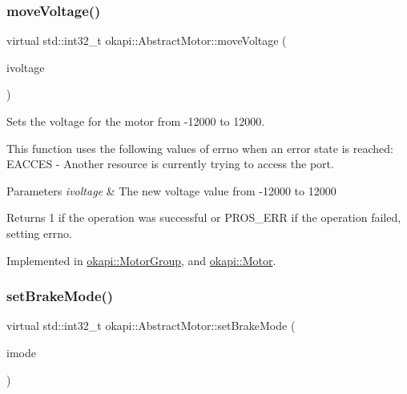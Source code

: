 \subsubsection{\texorpdfstring{moveVoltage()}{moveVoltage()}}
{\footnotesize\ttfamily virtual std\+::int32\+\_\+t okapi\+::\+Abstract\+Motor\+::move\+Voltage (\begin{DoxyParamCaption}\item[{std\+::int16\+\_\+t}]{ivoltage }\end{DoxyParamCaption})\hspace{0.3cm}{\ttfamily [pure virtual]}}

Sets the voltage for the motor from -\/12000 to 12000.

This function uses the following values of errno when an error state is reached\+: E\+A\+C\+C\+ES -\/ Another resource is currently trying to access the port.


\begin{DoxyParams}{Parameters}
{\em ivoltage} & The new voltage value from -\/12000 to 12000 \\
\hline
\end{DoxyParams}
\begin{DoxyReturn}{Returns}
1 if the operation was successful or P\+R\+O\+S\+\_\+\+E\+RR if the operation failed, setting errno. 
\end{DoxyReturn}


Implemented in \mbox{\hyperlink{classokapi_1_1MotorGroup_acebebe160f2c733ee497b1b8b50b0781}{okapi\+::\+Motor\+Group}}, and \mbox{\hyperlink{classokapi_1_1Motor_a64b53a041c90c7b7a3903c607a9b17eb}{okapi\+::\+Motor}}.

\mbox{\label{classokapi_1_1AbstractMotor_af7bb7d0d895c89d6b193f500587a818b}} 
\subsubsection{\texorpdfstring{setBrakeMode()}{setBrakeMode()}}
{\footnotesize\ttfamily virtual std\+::int32\+\_\+t okapi\+::\+Abstract\+Motor\+::set\+Brake\+Mode (\begin{DoxyParamCaption}\item[{\mbox{\hyperlink{classokapi_1_1AbstractMotor_a132e0485dbb59a60c3f934338d8fa601}{brake\+Mode}}}]{imode }\end{DoxyParamCaption})\hspace{0.3cm}{\ttfamily [pure virtual]}}

